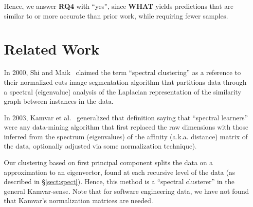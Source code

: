 \documentclass{newsig}
\newcommand{\bi}{\begin{itemize}}%
\newcommand{\ei}{\end{itemize}}
\newcommand{\tion}[1]{\S\ref{sect:#1}}
\newcommand{\fig}[1]{Figure~\ref{fig:#1}}
\newcommand{\what}{{\bf WHAT }}
\begin{document}




\begin{myshadowbox}
Hence, we answer {\bf RQ4} with ``yes'',
since \what yields predictions that are similar to or more accurate than prior
work, while requiring fewer samples.
\end{myshadowbox}


 \section{Related Work}
\label{sect:related}
 
In 2000, Shi and Maik~\cite{shi00} claimed the term ``spectral clustering'' as a reference to their normalized cuts
image
segmentation algorithm that  partitions data through a spectral (eigenvalue) analysis of the  
Laplacian representation of the similarity graph between instances in the data.

In 2003, Kamvar et al.~\cite{kamvar2003spectral}  generalized that definition saying that ``spectral learners''
were any data-mining algorithm that first replaced the raw
dimensions with those inferred from the spectrum (eigenvalues) of the affinity (a.k.a. distance)
matrix of the data, optionally adjusted via some normalization technique).

Our clustering based on first principal component splits the data on a   approximation to an eigenvector, found at each recursive level
of the data (as described in \tion{spect}). 
Hence, this  method is a ``spectral clusterer'' in the general Kamvar-sense. 
Note that
for software engineering data, we have
not found that Kamvar's normalization matrices are needed.
\end{document}
